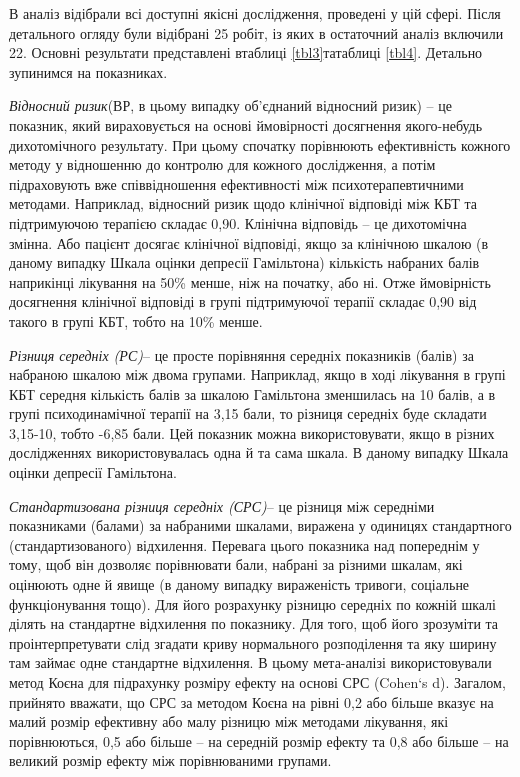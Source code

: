 \documentclass[twocolumn]{article}
\begin{document}
\par В аналіз відібрали всі доступні якісні дослідження, проведені у цій сфері. Після детального огляду були відібрані 25 робіт, із яких в остаточний аналіз включили 22. Основні результати представлені втаблиці \ref{tbl3}татаблиці \ref{tbl4}. Детально зупинимся на показниках.
\par \textit{Відносний ризик}(ВР, в цьому випадку об’єднаний відносний ризик) – це показник, який вираховується на основі ймовірності досягнення якого-небудь дихотомічного результату. При цьому спочатку порівнюють ефективність кожного методу у відношенню до контролю для кожного дослідження, а потім підраховують вже співвідношення ефективності між психотерапевтичними методами. Наприклад, відносний ризик щодо клінічної відповіді між КБТ та підтримуючою терапією складає 0,90. Клінічна відповідь – це дихотомічна змінна. Або пацієнт досягає клінічної відповіді, якщо за клінічною шкалою (в даному випадку Шкала оцінки депресії Гамільтона) кількість набраних балів наприкінці лікування на 50\% менше, ніж на початку, або ні. Отже ймовірність досягнення клінічної відповіді в групі підтримуючої терапії складає 0,90 від такого в групі КБТ, тобто на 10\% менше.
\par \textit{Різниця середніх (РС)}– це просте порівняння середніх показників (балів) за набраною шкалою між двома групами. Наприклад, якщо в ході лікування в групі КБТ середня кількість балів за шкалою Гамільтона зменшилась на 10 балів, а в групі психодинамічної терапії на 3,15 бали, то різниця середніх буде складати 3,15-10, тобто -6,85 бали. Цей показник можна використовувати, якщо в різних дослідженнях використовувалась одна й та сама шкала. В даному випадку Шкала оцінки депресії Гамільтона.
\par \textit{Стандартизована різниця середніх (СРС)}– це різниця між середніми показниками (балами) за набраними шкалами, виражена у одиницях стандартного (стандартизованого) відхилення. Перевага цього показника над попереднім у тому, щоб він дозволяє порівнювати бали, набрані за різними шкалам, які оцінюють одне й явище (в даному випадку вираженість тривоги, соціальне функціонування тощо). Для його розрахунку різницю середніх по кожній шкалі ділять на стандартне відхилення по показнику. Для того, щоб його зрозуміти та проінтерпретувати слід згадати криву нормального розподілення та яку ширину там займає одне стандартне відхилення. В цьому мета-аналізі використовували метод Коєна для підрахунку розміру ефекту на основі СРС (Cohen`s d). Загалом, прийнято вважати, що СРС за методом Коєна на рівні 0,2 або більше вказує на малий розмір ефективну або малу різницю між методами лікування, які порівнюються, 0,5 або більше – на середній розмір ефекту та 0,8 або більше – на великий розмір ефекту між порівнюваними групами.
\end{document}
